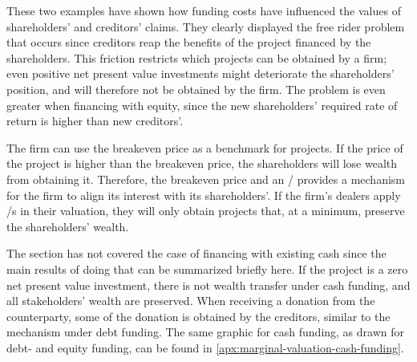 \documentclass[main.tex]{subfiles}
\begin{document}
    These two examples have shown how funding costs have influenced 
    the values of shareholders' and creditors' claims.
    They clearly displayed the free rider problem that occurs
    since creditors reap the benefits of the project financed by the shareholders.
    This friction restricts which projects can be obtained by a firm;
    even positive net present value investments might deteriorate the shareholders' position,
    and will therefore not be obtained by the firm.
    The problem is even greater when financing with equity, 
    since the new shareholders' required rate of return is higher than new creditors'.
   
    The firm can use the breakeven price as a benchmark for projects. 
    If the price of the project is higher than the breakeven price, 
    the shareholders will lose wealth from obtaining it.
    Therefore, the breakeven price and an \FVA/ provides a mechanism for the firm
    to align its interest with its shareholders'.
    If the firm's dealers apply \FVA/s in their valuation,
    they will only obtain projects that, at a minimum, preserve the shareholders' wealth.
    
    The section has not covered the case of financing with existing cash
    since the main results of doing that can be summarized briefly here.
    If the project is a zero net present value investment, 
    there is not wealth transfer under cash funding,
    and all stakeholders' wealth are preserved.
    When receiving a donation from the counterparty, 
    some of the donation is obtained by the creditors, similar to the mechanism under debt funding.
    The same graphic for cash funding, as drawn for debt- and equity funding, can be found in 
    \cref{apx:marginal-valuation-cash-funding}.
\end{document}
